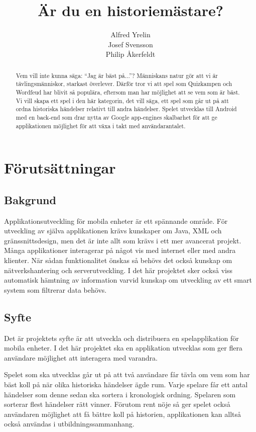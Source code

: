 \documentclass[swedish,12pt,a4paper]{article}
\author{Alfred Yrelin\\Josef Svensson\\Philip Åkerfeldt}
\title{Är du en historiemästare?}
\begin{document}
\maketitle
\begin{abstract}
Vem vill inte kunna säga: ``Jag är bäst på...''? Människans natur gör att vi är tävlingsmänniskor, starkast överlever. Därför tror vi att spel som Quizkampen och Wordfeud har blivit så populära, eftersom man har möjlighet att se vem som är bäst. Vi vill skapa ett spel i den här kategorin, det vill säga, ett spel som går ut på att ordna historiska händelser relativt till andra händelser. Spelet utvecklas till Android med en back-end som drar nytta av Google app-engines skalbarhet för att ge applikationen möjlighet för att växa i takt med användarantalet. 

\end{abstract}
\pagebreak
\section{Förutsättningar}
\subsection{Bakgrund}
Applikationsutveckling för mobila enheter är ett spännande område. För utveckling av själva applikationen krävs kunskaper om Java, XML och gränssnittsdesign, men det är inte allt som krävs i ett mer avancerat projekt. Många applikationer interagerar på något vis med internet eller med andra klienter. När sådan funktionalitet önskas så behövs det också kunskap om nätverkshantering och serverutveckling. I det här projektet sker också viss automatisk hämtning av information varvid kunskap om utveckling av ett smart system som filtrerar data behövs.
\subsection{Syfte}
Det är projektets syfte är att utveckla och distribuera en spelapplikation för mobila enheter. I det här projektet ska en applikation utvecklas som ger flera användare möjlighet att interagera med varandra.

Spelet som ska utvecklas går ut på att två användare får tävla om vem som har bäst koll på när olika historiska händelser ägde rum. Varje spelare får ett antal händelser som denne sedan ska sortera i kronologisk ordning. Spelaren som sorterar flest händelser rätt vinner. Förutom rent nöje så ger spelet också användaren möjlighet att få bättre koll på historien, applikationen kan alltså också användas i utbildningssammanhang.
\end{document}
